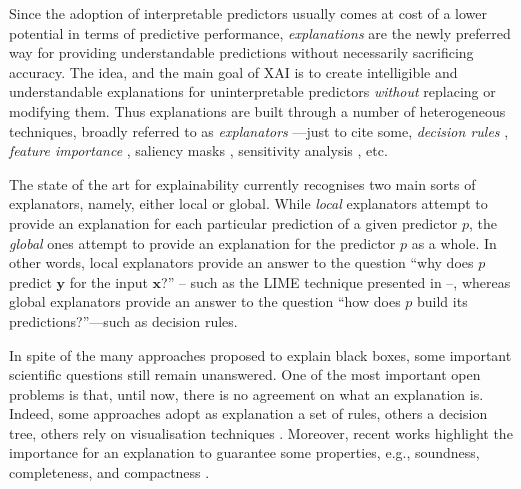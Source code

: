 \documentclass[12pt,a4paper,openright,twoside]{book}
\begin{document}

Since the adoption of interpretable predictors usually comes at cost of a lower potential in terms of predictive performance, \emph{explanations} are the newly preferred way for providing understandable predictions without necessarily sacrificing accuracy.
%
The idea, and the main goal of XAI is to create intelligible and understandable explanations for uninterpretable predictors \emph{without} replacing or modifying them.
%
Thus explanations are built through a number of heterogeneous techniques, broadly referred to as \emph{explanators} \cite{GuidottiMRTGP19}---just to cite some, \emph{decision rules} \cite{Augasta2012}, \emph{feature importance} \cite{tolomei2017interpretable}, saliency masks \cite{FongV17}, sensitivity analysis \cite{SundararajanTY17}, etc.

The state of the art for explainability currently recognises two main sorts of explanators, namely, either local or global. 
%
While \emph{local} explanators attempt to provide an explanation for each particular prediction of a given predictor $p$, the \emph{global} ones attempt to provide an explanation for the predictor $p$ as a whole.
%
In other words, local explanators provide an answer to the question ``why does $p$ predict $\mathbf{y}$ for the input $\mathbf{x}$?'' -- such as the LIME technique presented in \cite{RibeiroSG16} --, whereas global explanators provide an answer to the question ``how does $p$ build its predictions?''---such as decision rules.

In spite of the many approaches proposed to explain black boxes, some important scientific questions still remain unanswered. 
%
One of the most important open problems is that, until now, there is no agreement on what an explanation is. 
%
Indeed, some approaches adopt as explanation a set of rules, others a decision tree, others rely on visualisation techniques \cite{GuidottiMRTGP19}. 
%
Moreover, recent works highlight the importance for an explanation to guarantee some properties, e.g., soundness, completeness, and compactness \cite{GuidottiMRTGP19}. 


\end{document}
